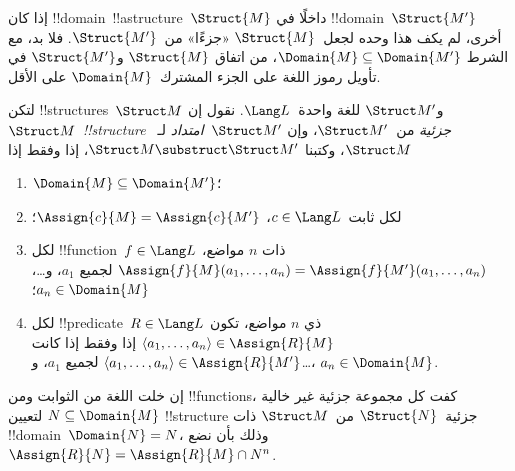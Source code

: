 \documentclass[../../../include/open-logic-section]{subfiles}
\begin{document}

إذا كان !!{domain}~!!a{structure}~$\Struct{M}$ داخلًا في
!!{domain}~$\Struct{M'}$ أخرى، لم يكف هذا وحده لجعل~$\Struct{M}$
«جزءًا» من~$\Struct{M'}$. فلا بد، مع الشرط $\Domain{M} \subseteq
\Domain{M'}$، من اتفاق $\Struct{M}$ و$\Struct{M'}$ في تأويل
رموز اللغة على الجزء المشترك~$\Domain{M}$ على الأقل.

\begin{defn}
لتكن !!{structure}s~$\Struct M$ و$\Struct M'$ للغة واحدة~$\Lang
L$. نقول إن $\Struct M$~\emph{!!{structure} جزئية} من~$\Struct M'$،
وإن $\Struct M'$~\emph{امتداد} لـ~$\Struct M$، وكتبنا $\Struct M
\substruct \Struct M'$، إذا وفقط إذا
\begin{enumerate}
\item $\Domain{M} \subseteq \Domain{M'}$؛
\item لكل ثابت~$c \in \Lang L$، $\Assign{c}{M} =
    \Assign{c}{M'}$؛
\item لكل !!{function}~$f \in \Lang L$ ذات $n$ مواضع،
  $\Assign{f}{M}(a_1, \dots, a_n) = \Assign{f}{M'}(a_1, \dots, a_n)$
  لجميع $a_1$، و\dots، $a_n \in \Domain{M}$؛
\item لكل !!{predicate}~$R \in \Lang L$ ذي $n$ مواضع، تكون $\langle
  a_1, \dots, a_n\rangle \in \Assign{R}{M}$ إذا وفقط إذا كانت
  $\langle a_1, \dots, a_n\rangle \in \Assign{R}{M'}$ لجميع $a_1$،
  و\dots، $a_n \in \Domain{M}$.
\end{enumerate}
\end{defn}

\begin{rem}
إن خلت اللغة من الثوابت ومن !!{function}s، كفت كل مجموعة جزئية غير
خالية $N \subseteq \Domain{M}$ لتعيين !!{structure} جزئية~$\Struct{N}$
من~$\Struct M$ ذات !!{domain}~$\Domain{N} = N$، وذلك بأن نضع
$\Assign{R}{N} = \Assign{R}{M} \cap N^n$.
\end{rem}

\end{document}
